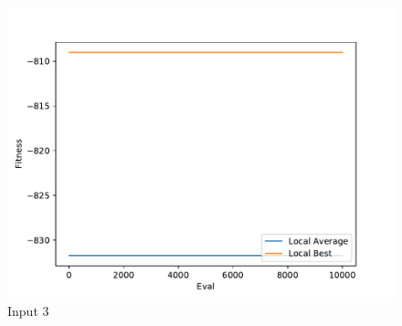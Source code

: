 \documentclass{standalone}
\begin{document}
\begin{figure}[!htb]
	\caption{Input 3}
	\label{fig:graph_3033}
	\includegraphics[width=\textwidth]{../graphs/graphs/3033.pdf}
\end{figure}
\end{document}
